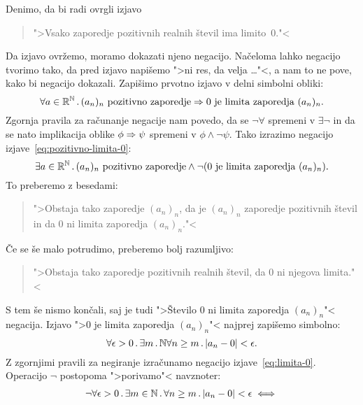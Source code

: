 \begin{zgled}
  Denimo, da bi radi ovrgli izjavo
  \begin{quote}
    ">Vsako zaporedje pozitivnih realnih števil ima limito~$0$."<
  \end{quote}
  Da izjavo ovržemo, moramo dokazati njeno negacijo. Načeloma lahko
  negacijo tvorimo tako, da pred izjavo napišemo ">ni res, da velja
  \dots"<, a nam to ne pove, kako bi negacijo dokazali. Zapišimo
  prvotno izjavo v delni simbolni obliki:
  \begin{equation}
    \label{eq:pozitivno-limita-0}
    \forall a \in \mathbb{R}^{\mathbb{N}} \,.\,{\text{$(a_n)_n$ pozitivno zaporedje}
      \Rightarrow \text{$0$ je limita zaporedja $(a_n)_n$}}.
  \end{equation}
  Zgornja pravila za računanje negacije nam povedo, da se
  $\lnot\forall$ spremeni v $\exists\lnot$ in da se nato implikacija
  oblike $\phi \Rightarrow \psi$ spremeni v $\phi \land \lnot\psi$. Tako
  izrazimo negacijo izjave~\eqref{eq:pozitivno-limita-0}:
  \begin{equation*}
    \exists a \in \mathbb{R}^{\mathbb{N}} \,.\,{\text{$(a_n)_n$ pozitivno zaporedje}
      \land \lnot (\text{$0$ je limita zaporedja $(a_n)_n$})}.
  \end{equation*}
  To preberemo z besedami:
  \begin{quote}
    ">Obstaja tako zaporedje $(a_n)_n$, da je $(a_n)_n$ zaporedje
    pozitivnih števil in da $0$ ni limita zaporedja $(a_n)_n$."<
  \end{quote}
  Če se še malo potrudimo, preberemo bolj razumljivo:
  \begin{quote}
    ">Obstaja tako zaporedje pozitivnih realnih števil, da $0$ ni
    njegova limita."<
  \end{quote}
  S tem še nismo končali, saj je tudi ">Število $0$ ni limita
  zaporedja $(a_n)_n$"< negacija. Izjavo ">$0$ je limita zaporedja
  $(a_n)_n$"< najprej zapišemo simbolno:
  \begin{equation}
    \label{eq:limita-0}
    \forall \epsilon > 0 \,.\,
      \exists m \,.\,{\mathbb{N}}
        \forall n \geq m \,.\,
          |a_n - 0| < \epsilon.
  \end{equation}
  Z zgornjimi pravili za negiranje izračunamo negacijo
  izjave~\eqref{eq:limita-0}. Operacijo $\lnot$ postopoma ">porivamo"<
  navznoter:
  \begin{align*}
    \lnot \all{\epsilon > 0} \some{m \in \NN} \all{n \geq m} |a_n
          - 0| < \epsilon & \iff
    \\

\end{align*}
\end{zgled}
